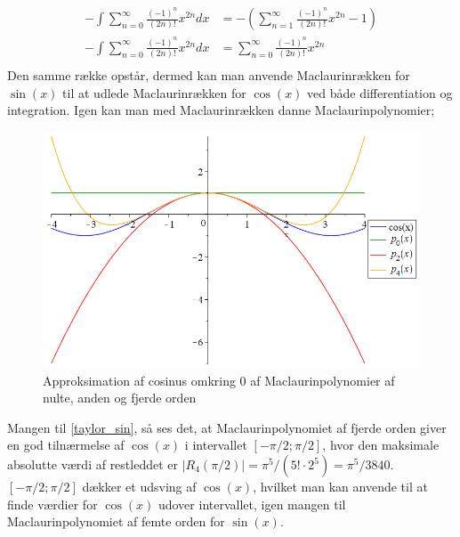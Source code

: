 \begin{align*}
-\int \sum_{n=0}^{\infty} \frac{(-1)^n}{(2n)!}x^{2n} dx
&=
-\left(\sum_{n=1}^{\infty} \frac{(-1)^n}{(2n)!}x^{2n}-1\right) \\
-\int \sum_{n=0}^{\infty} \frac{(-1)^n}{(2n)!}x^{2n} dx
&=
\sum_{n=0}^{\infty} \frac{(-1)^n}{(2n)!}x^{2n} \\
\end{align*}
Den samme række opstår, dermed kan man anvende Maclaurinrækken for $\sin(x)$ til at udlede Maclaurinrækken for $\cos(x)$ ved både differentiation og integration. Igen kan man med Maclaurinrækken danne Maclaurinpolynomier;
\begin{figure}[H]
	\centering
	\includegraphics[scale=0.4]{fig/img/taylor_cos}
	\caption{Approksimation af cosinus omkring 0 af Maclaurinpolynomier af nulte, anden og fjerde orden}
 	\label{taylor_cos}
\end{figure}
Mangen til \ref{taylor_sin}, så ses det, at Maclaurinpolynomiet af fjerde orden giver en god tilnærmelse af $\cos(x)$ i intervallet $[-\pi /2; \pi /2]$, hvor den maksimale absolutte værdi af restleddet er $\left\lvert R_4(\pi/2) \right\lvert = \pi^5/(5! \cdot 2^5) = \pi^5/3840$. $[-\pi /2; \pi /2]$ dækker et udsving af $\cos(x)$, hvilket man kan anvende til at finde værdier for $\cos(x)$ udover intervallet, igen mangen til Maclaurinpolynomiet af femte orden for $\sin(x)$.
